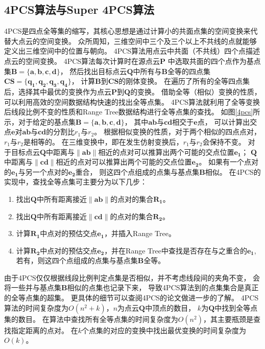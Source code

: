 \subsection{4PCS算法与Super 4PCS算法}
4PCS是四点全等集的缩写，其核心思想是通过计算小的共面点集的空间变换来代替大点云的空间变换。
众所周知，三维空间中三个及三个以上不共线的点就能够定义出三维空间中的位置与朝向。
4PCS算法用点云中共面（不共线）四个点描述点云的空间变换。
4PCS算法每次计算时在源点云$\bm{P}$
中选取共面的四个点作为基点集$\bm{B}=\{\bm{a},\bm{b},\bm{c},\bm{d}\}$，
然后找出目标点云$\bm{Q}$中所有与$\bm{B}$全等的四点集
$\bm{CS}=\{\bm{q_1},\bm{q_2},\bm{q_3},\bm{q_4}\}$，
计算$\bm{B}$到$\bm{CS}$的刚体变换。
在遍历了所有的全等四点集后，选择其中最优的变换作为点云$\bm{P}$到$\bm{Q}$的变换。
借助全等（相似）变换的性质，可以利用高效的空间数据结构快速的找出全等点集。
4PCS算法就利用了全等变换后线段比例不变的性质和Range Tree数据结构进行全等点集的查找。
如图\ref{4pcs}所示，对于给定的基点集$\bm{B}=\{\bm{a},\bm{b},\bm{c},\bm{d}\}$，
其中$\bm{ab}$与$\bm{cd}$相交于$\bm{e}$点，
可以计算出交点$\bm{e}$对$\bm{ab}$与$\bm{cd}$的分割比$r_1$与$r_2$。
根据相似变换的性质，对于两个相似的四点点对，$r_1$与$r_2$是相等的。
在三维变换中，即在发生仿射变换后，$r_1$与$r_2$会保持不变。
对于目标点云$\bm{Q}$中距离与$\|\bm{ab}\|$相近的点对可以推算出两个可能的交点位置$\bm{e_1}$；
$\bm{Q}$中距离与$\|\bm{cd}\|$相近的点对可以推算出两个可能的交点位置$\bm{e_2}$。
如果有一个点对的$\bm{e_1}$与另一个点对的$\bm{e_2}$重合，
则这四个点组成的点集与基点集$\bm{B}$相似。
在4PCS的实现中，查找全等点集可主要分为以下几步：
\begin{enumerate}
    \item   找出$\bm{Q}$中所有距离接近$\|\bm{ab}\|$的点对的集合$\bm{R_1}$。
    \item   找出$\bm{Q}$中所有距离接近$\|\bm{cd}\|$的点对的集合$\bm{R_2}$。
    \item   计算$\bm{R_1}$中点对的预估交点$\bm{e_1}$，并插入Range Tree。
    \item   计算$\bm{R_2}$中点对的预估交点$\bm{e_2}$，并在Range Tree中查找是否存在与之重合的$\bm{e_1}$,
            若有，则这四个点组成的点集与基点集$\bm{B}$全等。
  \end{enumerate}
由于4PCS仅仅根据线段比例判定点集是否相似，并不考虑线段间的夹角不变，
会将一些并与基点集$\bm{B}$相似的点集也记录下来，
导致4PCS算法到的点集集合是真正的全等点集的超集。
更具体的细节可以查阅4PCS的论文做进一步的了解。
4PCS算法的时间复杂度为$O(n^2+k)$，$n$为点云$\bm{Q}$中顶点的数目，
$k$为$\bm{Q}$中找到全等点集的数目。
在算法中查找所有全等点集的时间复杂度为$O(n^2)$，其主要瓶颈是查找指定距离的点对。
在$k$个点集的对应的变换中找出最优变换的时间复杂度为$O(k)$。

